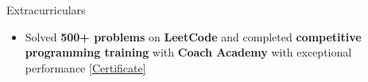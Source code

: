 \begin{rSection}{Extracurriculars}
	\begin{itemize}[leftmargin=*]
		\item Solved \textbf{500+ problems} on \textbf{LeetCode} and completed \textbf{competitive programming training} with \textbf{Coach Academy} with exceptional performance \hfill \href{https://drive.google.com/file/d/108HepAAlChBjtnjCsiZe3jbFZskPT3i1/view?usp=sharing}{[Certificate]}
	\end{itemize}
\end{rSection}